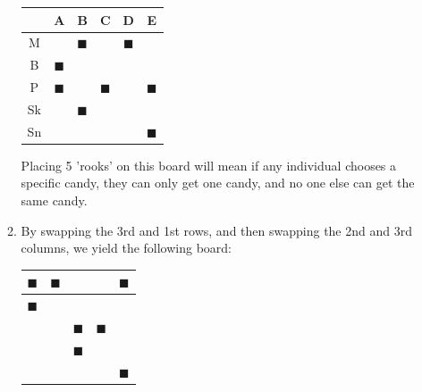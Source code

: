 \documentclass[12pt]{article}
\begin{document}
\begin{enumerate}
\begin{enumerate}
        \begin{center}
          \begin{tabular}{c|c|c|c|c|c|}
            & A              & B              & C              & D
            & E              \\
            \hline
            M  &                & $\blacksquare$ &                &
            $\blacksquare$ &                \\
            \hline
            B  & $\blacksquare$ &                &                &
            &                \\
            \hline
            P  & $\blacksquare$ &                & $\blacksquare$ &
            & $\blacksquare$ \\
            \hline
            Sk &                & $\blacksquare$ &                &
            &                \\
            \hline
            Sn &                &                &                &
            & $\blacksquare$ \\
            \hline
          \end{tabular}
        \end{center}
        Placing 5 'rooks' on this board will mean if any individual
        chooses a specific candy, they can only get one candy, and no
        one else can get the same candy.

        \newpage

      \item By swapping the 3rd and 1st rows, and then swapping the
        2nd and 3rd columns, we yield the following board:
        \begin{center}
          \begin{tabular}{|c|c|c|c|c|}
            \hline
            $\blacksquare$ & $\blacksquare$ &                &
            & $\blacksquare$ \\
            \hline
            $\blacksquare$ &                &                &
            &                \\
            \hline
            &                & $\blacksquare$ & $\blacksquare$ &
            \\
            \hline
            &                & $\blacksquare$ &                &
            \\
            \hline
            &                &                &                &
            $\blacksquare$ \\
            \hline
          \end{tabular}
        \end{center}


\end{enumerate}
\end{enumerate}
\end{document}
